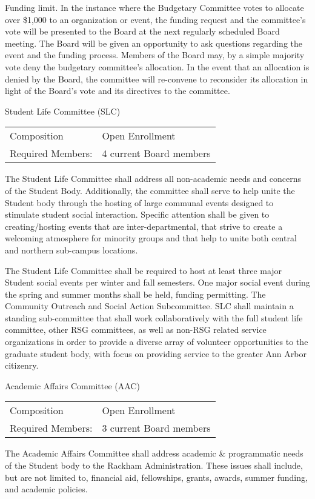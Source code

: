 \begin{enumsubsection}
\begin{enumsubsubsection}
\itemnotoc Funding limit. In the instance where the Budgetary Committee votes to 
allocate over \$1,000 to an organization or event, the funding request 
and the committee's vote will be presented to the Board at the next 
regularly scheduled Board meeting. The Board will be given an 
opportunity to ask questions regarding the event and the funding 
process. Members of the Board may, by a simple majority vote deny 
the budgetary committee's allocation. In the event that an allocation is 
denied by the Board, the committee will re-convene to reconsider its 
allocation in light of the Board's vote and its directives to the 
committee. 
\end{enumsubsubsection}
\item{Student Life Committee (SLC)}\\
\begin{tabular}{ll}
Composition & Open Enrollment\\
Required Members:& 4 current Board members
\end{tabular}
\begin{enumsubsubsection}
\itemnotoc The Student Life Committee shall address all non-academic needs and 
concerns of the Student Body. Additionally, the committee shall serve to 
help unite the Student body through the hosting of large communal events 
designed to stimulate student social interaction. Specific attention shall be 
given to creating/hosting events that are inter-departmental, that strive to 
create a welcoming atmosphere for minority groups and that help to unite 
both central and northern sub-campus locations. 

\itemnotoc The Student Life Committee shall be required to host at least three major Student social events per winter and fall semesters. One major social event 
during the spring and summer months shall be held, funding permitting. 
\itemnotoc The Community Outreach and Social Action Subcommittee. SLC shall maintain a standing sub-committee that shall work collaboratively with the full student life committee, other RSG committees, as well as non-RSG related service organizations in order to provide a diverse array of volunteer opportunities to the graduate student body, with focus on providing service to the greater Ann Arbor citizenry. 
\end{enumsubsubsection}
\item{Academic Affairs Committee (AAC)}\\
\begin{tabular}{ll}
Composition & Open Enrollment\\
Required Members:& 3 current Board members
\end{tabular}
\begin{enumsubsubsection}
\itemnotoc The Academic Affairs Committee shall address academic \& 
programmatic needs of the Student body to the Rackham 
Administration. These issues shall include, but are not limited to, 
financial aid, fellowships, grants, awards, summer funding, and 
academic policies. 


\end{enumsubsubsection}
\end{enumsubsection}
